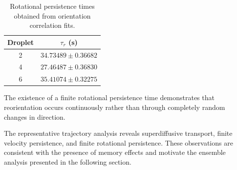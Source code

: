 \begin{table}[htbp]
\centering
\caption{Rotational persistence times obtained from orientation correlation fits.}
\begin{tabular}{cc}
\hline
Droplet & $\tau_r$ (s) \\
\hline
2 & $34.73489 \pm 0.36682$ \\
4 & $27.46487 \pm 0.36830$ \\
6 & $35.41074 \pm 0.32275$ \\
\hline
\end{tabular}
\end{table}

The existence of a finite rotational persistence time demonstrates that reorientation occurs continuously rather than through completely random changes in direction.

The representative trajectory analysis reveals superdiffusive transport, finite velocity persistence, and finite rotational persistence. These observations are consistent with the presence of memory effects and motivate the ensemble analysis presented in the following section\cite{balakrishnan2021}.
\clearpage
